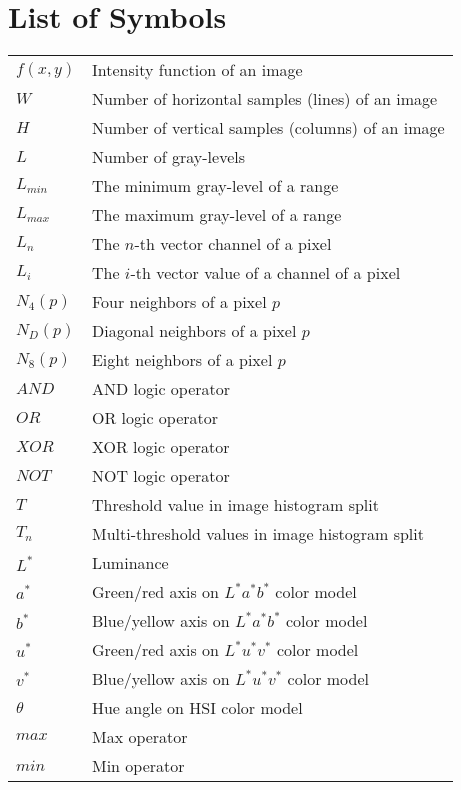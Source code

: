 \documentclass[11pt,twoside,a4paper]{book}
\theoremstyle{plain}
\theoremstyle{definition}
\begin{document}
\chapter{List of Symbols}
\begin{tabular}{ll}
    $f(x, y)$   & Intensity function of an image \\
    $W$         & Number of horizontal samples (lines) of an image \\
    $H$         & Number of vertical samples (columns) of an image \\
    $L$         & Number of gray-levels \\
    $L_{min}$   & The minimum gray-level of a range \\
    $L_{max}$   & The maximum gray-level of a range \\
    $L_n$       & The $n$-th vector channel of a pixel \\
    $L_i$       & The $i$-th vector value of a channel of a pixel \\
    $N_4(p)$    & Four neighbors of a pixel $p$ \\
    $N_D(p)$    & Diagonal neighbors of a pixel $p$ \\
    $N_8(p)$    & Eight neighbors of a pixel $p$ \\
    $AND$       & AND logic operator \\
    $OR$        & OR logic operator \\
    $XOR$       & XOR logic operator \\
    $NOT$       & NOT logic operator \\
    $T$         & Threshold value in image histogram split \\
    $T_n$       & Multi-threshold values in image histogram split \\
    $L^*$       & Luminance \\
    $a^*$       & Green/red axis on $L^*a^*b^*$ color model \\
    $b^*$       & Blue/yellow axis on $L^*a^*b^*$ color model \\
    $u^*$       & Green/red axis on $L^*u^*v^*$ color model \\
    $v^*$       & Blue/yellow axis on $L^*u^*v^*$ color model \\
    $\theta$    & Hue angle on HSI color model \\
    $max$       & Max operator \\
    $min$       & Min operator \\

\end{tabular}
\end{document}
